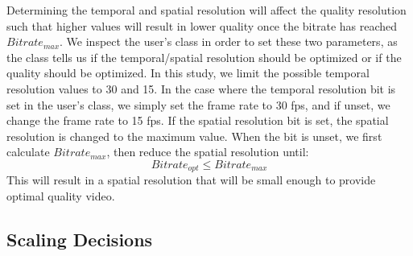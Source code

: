 \documentclass[a4paper,12pt]{article}
\begin{document}
Determining the temporal and spatial resolution will affect the quality resolution such that higher values will result in lower quality once the bitrate has reached $Bitrate_{max}$. We inspect the user’s class in order to set these two parameters, as the class tells us if the temporal/spatial resolution should be optimized or if the quality should be optimized. In this study, we limit the possible temporal resolution values to 30 and 15. In the case where the temporal resolution bit is set in the user’s class, we simply set the frame rate to 30 fps, and if unset, we change the frame rate to 15 fps. If the spatial resolution bit is set, the spatial resolution is changed to the maximum value. When the bit is unset, we first calculate $Bitrate_{max}$, then reduce the spatial resolution until:
\begin{equation}
\label{equ:OptMaxRelation}
Bitrate_{opt} \le Bitrate_{max}
\end{equation}
This will result in a spatial resolution that will be small enough to provide optimal quality video.

\subsection{Scaling Decisions}
\end{document}

